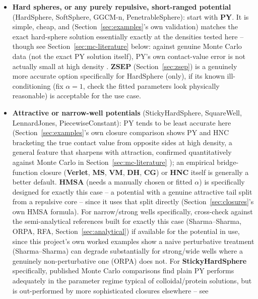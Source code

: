 \documentclass[11pt,a4paper]{article}
\begin{document}
\begin{itemize}[nosep]
  \item \textbf{Hard spheres, or any purely repulsive, short-ranged
    potential} (HardSphere, SoftSphere, GGCM-n, PenetrableSphere): start with
    \textbf{PY}. It is simple, cheap, and (Section~\ref{sec:examples}'s own
    validation) matches the exact hard-sphere solution essentially exactly at
    the densities tested here -- though see Section~\ref{sec:mc-literature}
    below: against genuine Monte Carlo data (not the exact PY solution
    itself), PY's own contact-value error is not actually small at high
    density \cite{PihlajamaaJanssen2024}. \textbf{ZSEP} (Section~\ref{sec:zsep}) is a
    genuinely more accurate option specifically for HardSphere (only), if its
    known ill-conditioning (fix $\alpha=1$, check the fitted parameters look
    physically reasonable) is acceptable for the use case.
  \item \textbf{Attractive or narrow-well potentials}
    (StickyHardSphere, SquareWell, LennardJones, PiecewiseConstant):
    PY tends to be least accurate here (Section~\ref{sec:examples}'s own
    closure comparison shows PY and HNC bracketing the true contact value
    from opposite sides at high density, a general feature that sharpens with
    attraction, confirmed quantitatively against Monte Carlo in
    Section~\ref{sec:mc-literature} \cite{PihlajamaaJanssen2024}); an empirical
    bridge-function closure (\textbf{Verlet}, \textbf{MS}, \textbf{VM},
    \textbf{DH}, \textbf{CG}) or \textbf{HNC} itself is generally a better
    default. \textbf{HMSA} (needs a manually chosen or fitted $\alpha$) is
    specifically designed for exactly this case -- a potential with a genuine
    attractive tail split from a repulsive core -- since it uses that split
    directly (Section~\ref{sec:closures}'s own HMSA formula). For narrow/strong
    wells specifically, cross-check against the semi-analytical references
    built for exactly this case (Sharma--Sharma, ORPA, RFA,
    Section~\ref{sec:analytical}) if available for the potential in use,
    since this project's own worked examples show a naive perturbative
    treatment (Sharma--Sharma) can degrade substantially for strong/wide
    wells where a genuinely non-perturbative one (ORPA) does not. For
    \textbf{StickyHardSphere} specifically, published Monte Carlo comparisons
    \cite{gazzillo2004} find plain PY performs adequately in the parameter
    regime typical of colloidal/protein solutions, but is out-performed by
    more sophisticated closures elsewhere -- see

\end{itemize}
\end{document}
